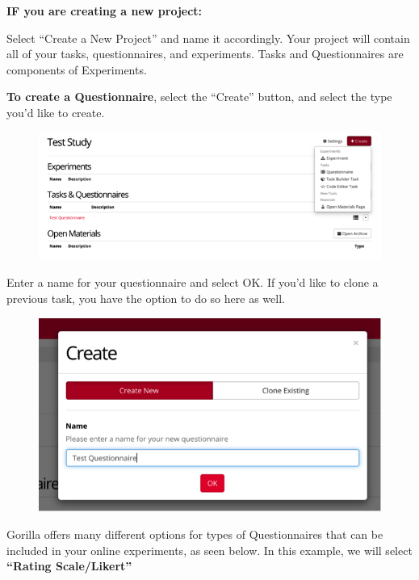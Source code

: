 \documentclass[]{book}
\begin{document}
\textbf{IF you are creating a new project:}

Select ``Create a New Project'' and name it accordingly. Your project will contain all of your tasks, questionnaires, and experiments. Tasks and Questionnaires are components of Experiments.

\textbf{To create a Questionnaire}, select the ``Create'' button, and select the type you'd like to create.

\begin{figure}
\centering
\includegraphics{images/research_protocols/gorilla/gorilla7.png}
\caption{}
\end{figure}

Enter a name for your questionnaire and select OK. If you'd like to clone a previous task, you have the option to do so here as well.

\begin{figure}
\centering
\includegraphics{images/research_protocols/gorilla/gorilla8.png}
\caption{}
\end{figure}

Gorilla offers many different options for types of Questionnaires that can be included in your online experiments, as seen below. In this example, we will select \textbf{``Rating Scale/Likert''}
\end{document}

